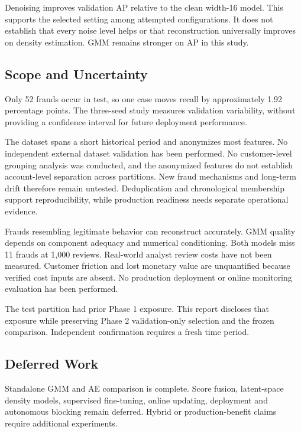 \documentclass[conference]{IEEEtran}
\begin{document}
Denoising improves validation AP relative to the clean width-16 model. This supports the selected setting among attempted configurations. It does not establish that every noise level helps or that reconstruction universally improves on density estimation. GMM remains stronger on AP in this study.

\subsection{Scope and Uncertainty}
Only 52 frauds occur in test, so one case moves recall by approximately 1.92 percentage points. The three-seed study measures validation variability, without providing a confidence interval for future deployment performance.

The dataset spans a short historical period and anonymizes most features. No independent external dataset validation has been performed. No customer-level grouping analysis was conducted, and the anonymized features do not establish account-level separation across partitions. New fraud mechanisms and long-term drift therefore remain untested. Deduplication and chronological membership support reproducibility, while production readiness needs separate operational evidence.

Frauds resembling legitimate behavior can reconstruct accurately. GMM quality depends on component adequacy and numerical conditioning. Both models miss 11 frauds at 1,000 reviews. Real-world analyst review costs have not been measured. Customer friction and lost monetary value are unquantified because verified cost inputs are absent. No production deployment or online monitoring evaluation has been performed.

The test partition had prior Phase 1 exposure. This report discloses that exposure while preserving Phase 2 validation-only selection and the frozen comparison. Independent confirmation requires a fresh time period.

\subsection{Deferred Work}
Standalone GMM and AE comparison is complete. Score fusion, latent-space density models, supervised fine-tuning, online updating, deployment and autonomous blocking remain deferred. Hybrid or production-benefit claims require additional experiments.
\end{document}
